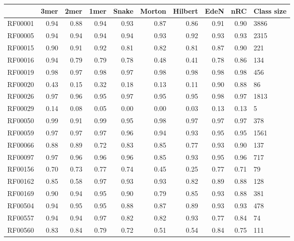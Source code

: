 \begin{tabular}{lrrrrrrrrl}
\toprule
{} &  3mer &  2mer &  1mer &  Snake &  Morton &  Hilbert &  EdeN &  nRC & Class size \\
\midrule
RF00001      &  0.94 &  0.88 &  0.94 &   0.93 &    0.87 &     0.86 &  0.91 & 0.90 &       3886 \\
RF00005      &  0.94 &  0.94 &  0.94 &   0.94 &    0.93 &     0.92 &  0.93 & 0.93 &       2315 \\
RF00015      &  0.90 &  0.91 &  0.92 &   0.81 &    0.82 &     0.81 &  0.87 & 0.90 &        221 \\
RF00016      &  0.94 &  0.79 &  0.79 &   0.78 &    0.48 &     0.41 &  0.78 & 0.86 &        134 \\
RF00019      &  0.98 &  0.97 &  0.98 &   0.97 &    0.98 &     0.98 &  0.98 & 0.98 &        456 \\
RF00020      &  0.43 &  0.15 &  0.32 &   0.18 &    0.13 &     0.11 &  0.90 & 0.88 &         86 \\
RF00026      &  0.97 &  0.96 &  0.95 &   0.97 &    0.95 &     0.95 &  0.98 & 0.97 &       1813 \\
RF00029      &  0.14 &  0.08 &  0.05 &   0.00 &    0.00 &     0.03 &  0.13 & 0.13 &          5 \\
RF00050      &  0.99 &  0.91 &  0.99 &   0.95 &    0.98 &     0.97 &  0.97 & 0.97 &        378 \\
RF00059      &  0.97 &  0.97 &  0.97 &   0.96 &    0.94 &     0.93 &  0.95 & 0.95 &       1561 \\
RF00066      &  0.88 &  0.89 &  0.72 &   0.83 &    0.85 &     0.77 &  0.93 & 0.90 &        137 \\
RF00097      &  0.97 &  0.96 &  0.96 &   0.96 &    0.85 &     0.93 &  0.95 & 0.96 &        717 \\
RF00156      &  0.70 &  0.73 &  0.77 &   0.74 &    0.45 &     0.25 &  0.77 & 0.71 &         79 \\
RF00162      &  0.85 &  0.58 &  0.97 &   0.93 &    0.93 &     0.82 &  0.89 & 0.88 &        128 \\
RF00169      &  0.90 &  0.94 &  0.95 &   0.90 &    0.79 &     0.85 &  0.93 & 0.88 &        381 \\
RF00504      &  0.94 &  0.95 &  0.95 &   0.88 &    0.87 &     0.89 &  0.93 & 0.93 &        478 \\
RF00557      &  0.94 &  0.94 &  0.97 &   0.82 &    0.82 &     0.93 &  0.77 & 0.84 &         74 \\
RF00560      &  0.83 &  0.84 &  0.79 &   0.72 &    0.51 &     0.54 &  0.84 & 0.75 &        111 \\

\end{tabular}
